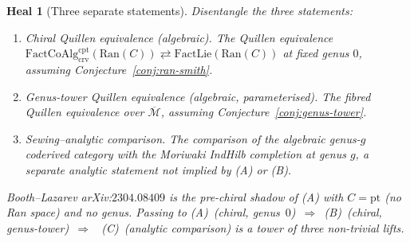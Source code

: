\documentclass[11pt]{amsart}
\newtheorem*{heal}{Heal}
\newcommand{\cM}{\mathcal{M}}
\newcommand{\Ran}{\mathrm{Ran}}
\newcommand{\FactCoAlg}{\mathrm{FactCoAlg}}
\newcommand{\FactLie}{\mathrm{FactLie}}
\newcommand{\crv}{\mathrm{crv}}
\newcommand{\cpt}{\mathrm{cpt}}
\newcommand{\Mbar}{\overline{\cM}}
\begin{document}
\begin{heal}[Three separate statements]
Disentangle the three statements:
\begin{enumerate}[label=(\Alph*)]
\item \emph{Chiral Quillen equivalence (algebraic).} The Quillen
equivalence
$\FactCoAlg^{\cpt}_{\crv}(\Ran(C))\rightleftarrows
\FactLie(\Ran(C))$ at fixed genus $0$, assuming
Conjecture~\ref{conj:ran-smith}.
\item \emph{Genus-tower Quillen equivalence (algebraic, parameterised).}
The fibred Quillen equivalence over $\Mbar$, assuming
Conjecture~\ref{conj:genus-tower}.
\item \emph{Sewing--analytic comparison.} The comparison of the
algebraic genus-$g$ coderived category with the Moriwaki
IndHilb completion at genus $g$, a separate analytic statement
not implied by (A) or (B).
\end{enumerate}
Booth--Lazarev arXiv:$2304.08409$ is the pre-chiral shadow of (A)
with $C=\mathrm{pt}$ (no Ran space) and no genus. Passing to
(A)~(chiral, genus~$0$)~$\Rightarrow$~(B)~(chiral, genus-tower)~$\Rightarrow$~
(C)~(analytic comparison) is a tower of three non-trivial lifts.
\end{heal}
\end{document}
